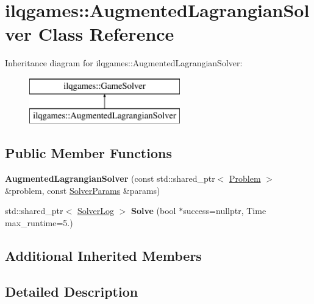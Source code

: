 \hypertarget{classilqgames_1_1_augmented_lagrangian_solver}{}\section{ilqgames\+:\+:Augmented\+Lagrangian\+Solver Class Reference}
\label{classilqgames_1_1_augmented_lagrangian_solver}
Inheritance diagram for ilqgames\+:\+:Augmented\+Lagrangian\+Solver\+:\begin{figure}[H]
\begin{center}
\leavevmode
\includegraphics[height=2.000000cm]{classilqgames_1_1_augmented_lagrangian_solver}
\end{center}
\end{figure}
\subsection*{Public Member Functions}
\begin{DoxyCompactItemize}
\item 
{\bfseries Augmented\+Lagrangian\+Solver} (const std\+::shared\+\_\+ptr$<$ \hyperlink{classilqgames_1_1_problem}{Problem} $>$ \&problem, const \hyperlink{structilqgames_1_1_solver_params}{Solver\+Params} \&params)\hypertarget{classilqgames_1_1_augmented_lagrangian_solver_abec468e1fa8577090728aec8a40fa542}{}\label{classilqgames_1_1_augmented_lagrangian_solver_abec468e1fa8577090728aec8a40fa542}

\item 
std\+::shared\+\_\+ptr$<$ \hyperlink{classilqgames_1_1_solver_log}{Solver\+Log} $>$ {\bfseries Solve} (bool $\ast$success=nullptr, Time max\+\_\+runtime=5.)\hypertarget{classilqgames_1_1_augmented_lagrangian_solver_a0a374de75671a4ab8f29beb92850a5cc}{}\label{classilqgames_1_1_augmented_lagrangian_solver_a0a374de75671a4ab8f29beb92850a5cc}

\end{DoxyCompactItemize}
\subsection*{Additional Inherited Members}


\subsection{Detailed Description}


